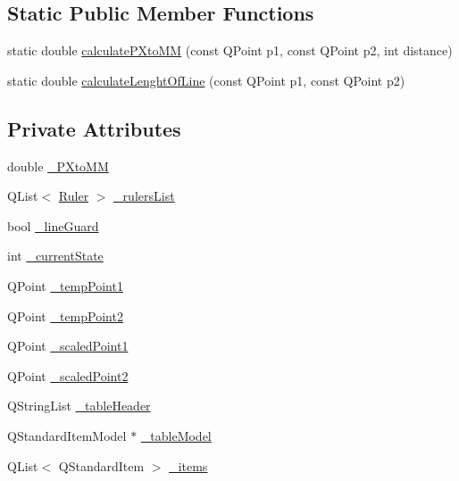 \subsection*{Static Public Member Functions}
\begin{DoxyCompactItemize}
\item 
static double \mbox{\hyperlink{class_lines_class_a7b00d7bf8c4c9b96d643c2299c52ea62}{calculate\+P\+Xto\+MM}} (const Q\+Point p1, const Q\+Point p2, int distance)
\item 
static double \mbox{\hyperlink{class_lines_class_ad8ab0bbd2b5482724948b04eba86d2f2}{calculate\+Lenght\+Of\+Line}} (const Q\+Point p1, const Q\+Point p2)
\end{DoxyCompactItemize}
\subsection*{Private Attributes}
\begin{DoxyCompactItemize}
\item 
double \mbox{\hyperlink{class_lines_class_a6869ce06b3b8f1ff0bc85f323f6b6ee5}{\+\_\+\+P\+Xto\+MM}}
\item 
Q\+List$<$ \mbox{\hyperlink{class_ruler}{Ruler}} $>$ \mbox{\hyperlink{class_lines_class_a433f7193cb50a8372c7c02289b0416d8}{\+\_\+rulers\+List}}
\item 
bool \mbox{\hyperlink{class_lines_class_a8ab6e5a5c6a794c5cfbc1dc0dea60c1e}{\+\_\+line\+Guard}}
\item 
int \mbox{\hyperlink{class_lines_class_a223a0a0577e6b9c026d8fd6df1b7ac3d}{\+\_\+current\+State}}
\item 
Q\+Point \mbox{\hyperlink{class_lines_class_ae6dfe8a03b4d94cc17486f4020b6ad5e}{\+\_\+temp\+Point1}}
\item 
Q\+Point \mbox{\hyperlink{class_lines_class_a6c65dce259446985fdd0c97525e55642}{\+\_\+temp\+Point2}}
\item 
Q\+Point \mbox{\hyperlink{class_lines_class_aaac1333fecbdb6682e43e6d2bfdcb4b3}{\+\_\+scaled\+Point1}}
\item 
Q\+Point \mbox{\hyperlink{class_lines_class_ab9573e0491994cddee75df125e66d037}{\+\_\+scaled\+Point2}}
\item 
Q\+String\+List \mbox{\hyperlink{class_lines_class_affcc1952d16f79fc9f4815c66e8302f2}{\+\_\+table\+Header}}
\item 
Q\+Standard\+Item\+Model $\ast$ \mbox{\hyperlink{class_lines_class_adbe970f0f58c2a517cb1997df551f864}{\+\_\+table\+Model}}
\item 
Q\+List$<$ Q\+Standard\+Item $>$ \mbox{\hyperlink{class_lines_class_af7ec7c1514700f3bab268d3179f259e1}{\+\_\+items}}
\end{DoxyCompactItemize}


